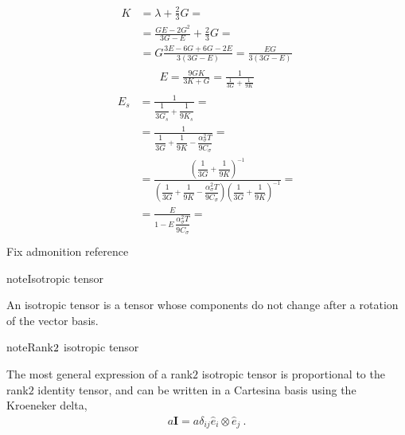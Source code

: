 \documentclass[letterpaper,10pt,english]{jupyterBook}
\begin{document}
\begin{equation*}
\begin{split}\begin{aligned}
  K 
  & = \lambda + \frac{2}{3} G = \\
  & = \frac{GE - 2G^2}{3G-E} + \frac{2}{3} G = \\
  & = G \frac{3 E - 6 G + 6 G - 2 E}{3(3 G -  E)} = \frac{E G}{3 (3 G - E)}
\end{aligned}\end{split}
\end{equation*}\begin{equation*}
\begin{split}E = \frac{9 G K}{ 3 K + G } = \frac{1}{ \frac{1}{3 G} + \frac{1}{9 K}} \end{split}
\end{equation*}\begin{equation*}
\begin{split}\begin{aligned}
  E_s 
  & = \frac{1}{ \dfrac{1}{3 G_s} + \dfrac{1}{9 K_s}} = \\
  & = \frac{1}{\dfrac{1}{3 G} + \dfrac{1}{9 K} - \dfrac{\alpha^2_\sigma T}{9 C_\sigma}} = \\
  & = \frac{\left(\dfrac{1}{3 G} + \dfrac{1}{9 K}\right)^{-1}}{\left(\dfrac{1}{3 G} + \dfrac{1}{9 K} - \dfrac{\alpha^2_\sigma T}{9 C_\sigma}\right)\left(\dfrac{1}{3 G} + \dfrac{1}{9 K}\right)^{-1}} = \\
  & = \frac{E}{1 - E \, \dfrac{\alpha^2_\sigma T}{9 C_\sigma}} = \\
\end{aligned}\end{split}
\end{equation*}
\sphinxAtStartPar
Fix admonition reference

\begin{sphinxadmonition}{note}{Isotropic tensor}

\sphinxAtStartPar
An isotropic tensor is a tensor whose components do not change after a rotation of the vector basis.  
\end{sphinxadmonition}

\begin{sphinxadmonition}{note}{Rank\sphinxhyphen{}\protect\(2\protect\) isotropic tensor}

\sphinxAtStartPar
The most general expression of a rank\sphinxhyphen{}\(2\) isotropic tensor is proportional to the rank\sphinxhyphen{}\(2\) identity tensor, and can be written in a Cartesina basis using the Kroeneker delta,
\begin{equation*}
\begin{split}a \mathbf{I} = a \delta_{ij} \hat{e}_i \otimes \hat{e}_j \ .\end{split}
\end{equation*}
\sphinxAtStartPar
{} 
\end{sphinxadmonition}
\end{document}
